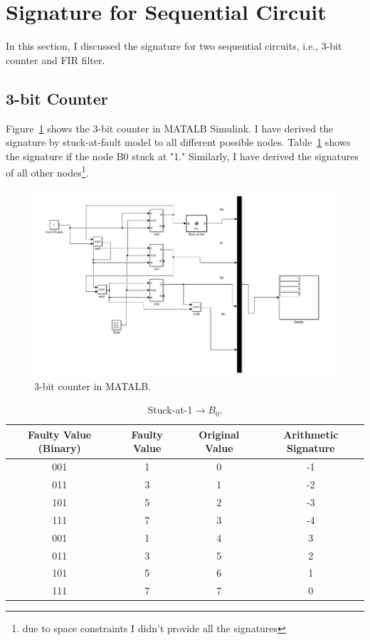 \section{Signature for Sequential Circuit}
In this section, I discussed the signature for two sequential circuits, i.e., 3-bit counter and FIR filter.
\subsection{3-bit Counter}

Figure~\ref{fig:matlab} shows the 3-bit counter in MATALB Simulink. I have derived the signature by stuck-at-fault model to all different possible nodes. Table~\ref{stuck}  shows the signature if the node B0 stuck at "1." Similarly, I have derived the signatures of all other nodes\footnote{due to space constraints I didn't provide all the signatures}.

\begin{figure}[tb!]
 \centering
  \captionsetup{justification=centering}    
   \includegraphics[scale=0.6]{Figures/matlab-counter.pdf}
   \caption{3-bit counter in MATALB.}
\label{fig:matlab}
\end{figure}

\begin{table}[tb!]
\center
\caption{Stuck-at-1$\rightarrow B_0$.}
\label{stuck}
\begin{tabular}{|c | c| c | c| } 
 \hline
 \rowcolor{lightgray}
Faulty Value (Binary) & Faulty Value & Original Value & Arithmetic Signature   \\ 
\hline
 
 
 001& 1 &0 & -1  \\
 \hline
 011 & 3 & 1 & -2 \\ 
 \hline
 
 101 & 5 & 2 & -3 \\
 \hline
 111& 7& 3& -4 \\
 \hline
 001 & 1  &  4& 3 \\
 \hline
 011 & 3 & 5 &2  \\
 \hline
 101 & 5 & 6 & 1 \\
 \hline
 111 & 7 & 7 & 0 \\
 \hline
 
 
\end{tabular}
\end{table}

